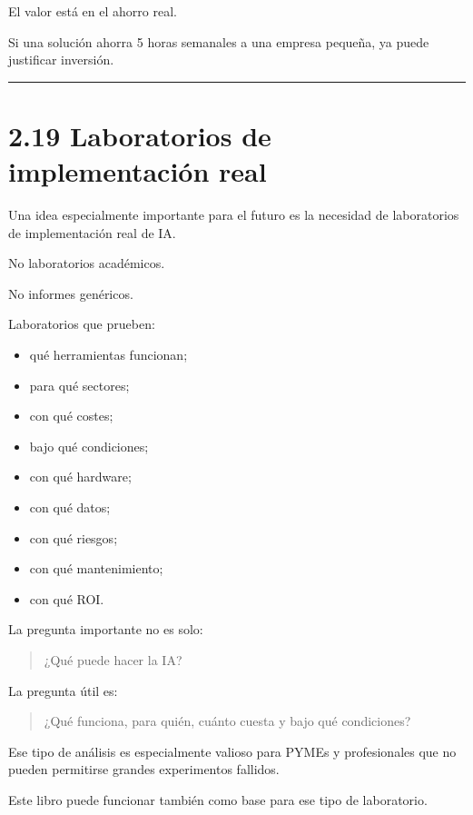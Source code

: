El valor está en el ahorro real.

Si una solución ahorra 5 horas semanales a una empresa pequeña, ya puede
justificar inversión.

\begin{center}\rule{0.5\linewidth}{0.5pt}\end{center}

\section{2.19 Laboratorios de implementación
real}\label{laboratorios-de-implementaciuxf3n-real}

Una idea especialmente importante para el futuro es la necesidad de
laboratorios de implementación real de IA.

No laboratorios académicos.

No informes genéricos.

Laboratorios que prueben:

\begin{itemize}
\tightlist
\item
  qué herramientas funcionan;
\item
  para qué sectores;
\item
  con qué costes;
\item
  bajo qué condiciones;
\item
  con qué hardware;
\item
  con qué datos;
\item
  con qué riesgos;
\item
  con qué mantenimiento;
\item
  con qué ROI.
\end{itemize}

La pregunta importante no es solo:

\begin{quote}
¿Qué puede hacer la IA?
\end{quote}

La pregunta útil es:

\begin{quote}
¿Qué funciona, para quién, cuánto cuesta y bajo qué condiciones?
\end{quote}

Ese tipo de análisis es especialmente valioso para PYMEs y profesionales
que no pueden permitirse grandes experimentos fallidos.

Este libro puede funcionar también como base para ese tipo de
laboratorio.

